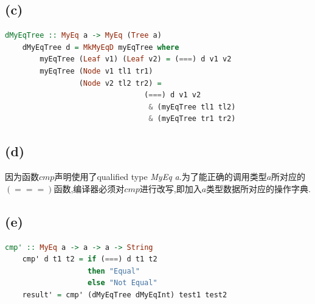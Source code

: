 \documentclass{paper}
\begin{document}
\subsection*{(c)}
	\begin{lstlisting}[language=Haskell]
	dMyEqTree :: MyEq a -> MyEq (Tree a)
	dMyEqTree d = MkMyEqD myEqTree where
		myEqTree (Leaf v1) (Leaf v2) = (===) d v1 v2
		myEqTree (Node v1 tl1 tr1) 
				 (Node v2 tl2 tr2) = 
								(===) d v1 v2 
								 & (myEqTree tl1 tl2) 
								 & (myEqTree tr1 tr2)
	\end{lstlisting}
	
\subsection*{(d)} 因为函数$cmp$声明使用了qualified type \textit{MyEq a}.为了能正确的调用类型$a$所对应的$(===)$函数,编译器必须对$cmp$进行改写,即加入$a$类型数据所对应的操作字典.

\subsection*{(e)} 
	\begin{lstlisting}[language=Haskell]
	cmp' :: MyEq a -> a -> a -> String
	cmp' d t1 t2 = if (===) d t1 t2 
				   then "Equal"
				   else "Not Equal"
	result' = cmp' (dMyEqTree dMyEqInt) test1 test2				
	\end{lstlisting}
	
\end{document}
